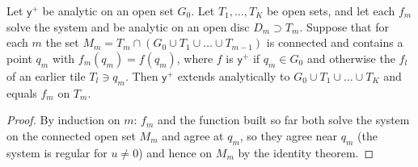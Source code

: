 \documentclass{amsart}
\numberwithin{equation}{section}
\theoremstyle{plain}
\newenvironment{lemnamed}[1]{\renewcommand\theinnerlem{#1}\innerlem}{\endinnerlem}
\theoremstyle{definition}
\theoremstyle{remark}
\begin{document}
\begin{lemnamed}{G (gluing)}\label{lem:G}
Let $\mathsf y^+$ be analytic on an open set $G_0$. Let $T_1, \dots, T_K$ be open sets, and let each $f_m$ solve the system and be analytic
on an open disc $D_m \supset T_m$. Suppose that for each $m$ the set $M_m = T_m \cap (G_0 \cup T_1 \cup\dots\cup T_{m-1})$ is connected
and contains a point $q_m$ with $f_m(q_m) = f(q_m)$, where $f$ is $\mathsf y^+$ if $q_m \in G_0$ and otherwise the $f_l$ of an earlier tile
$T_l \ni q_m$. Then $\mathsf y^+$ extends analytically to $G_0 \cup T_1 \cup\dots\cup T_K$ and equals $f_m$ on $T_m$.
\end{lemnamed}

\begin{proof}
By induction on $m$: $f_m$ and the function built so far both solve the system on the connected open set $M_m$ and agree at
$q_m$, so they agree near $q_m$ (the system is regular for $u \ne 0$) and hence on $M_m$ by the identity theorem.
\end{proof}
\end{document}

